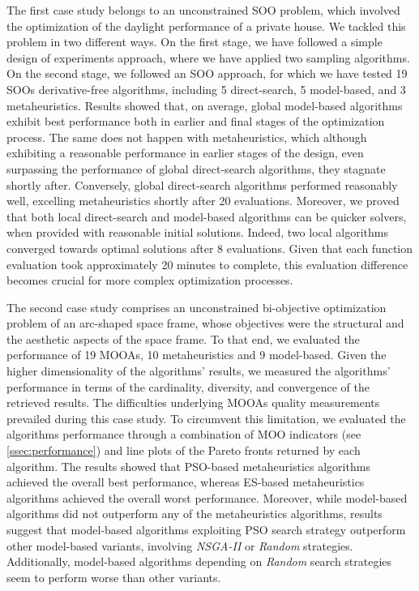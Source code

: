 The first case study belongs to an unconstrained \ac{SOO} problem, which involved the optimization of the daylight performance of a private house. We tackled this problem in two different ways. On the first stage, we have followed a simple design of experiments approach, where we have applied two sampling algorithms. On the second stage, we followed an \ac{SOO} approach, for which we have tested 19 \acp{SOO} derivative-free algorithms, including 5 direct-search, 5 model-based, and 3 metaheuristics. Results showed that, on average, global model-based algorithms exhibit best performance both in earlier and final stages of the optimization process. The same does not happen with metaheuristics, which although exhibiting a reasonable performance in earlier stages of the design, even surpassing the performance of global direct-search algorithms, they stagnate shortly after. Conversely, global direct-search algorithms performed reasonably well, excelling metaheuristics shortly after 20 evaluations. Moreover, we proved that both local direct-search and model-based algorithms can be quicker solvers, when provided with reasonable initial solutions. Indeed, two local algorithms converged towards optimal solutions after 8 evaluations. Given that each function evaluation took approximately 20 minutes to complete, this evaluation difference becomes crucial for more complex optimization processes.

The second case study comprises an unconstrained bi-objective optimization problem of an arc-shaped space frame, whose objectives were the structural and the aesthetic aspects of the space frame. To that end, we evaluated the performance of 19 \acp{MOOA}, 10 metaheuristics and 9 model-based. Given the higher dimensionality of the algorithms' results, we measured the algorithms' performance in terms of the cardinality, diversity, and convergence of the retrieved results.  The difficulties underlying \acp{MOOA} quality measurements prevailed during this case study. To circumvent this limitation, we evaluated the algorithms performance through a combination of \ac{MOO} indicators (see \cref{ssec:performance}) and line plots of the Pareto fronts returned by each algorithm. The results showed that \ac{PSO}-based metaheuristics  algorithms achieved the overall best performance, whereas \ac{ES}-based metaheuristics algorithms achieved the overall worst performance. Moreover, while model-based algorithms did not outperform any of the metaheuristics algorithms, results suggest that model-based algorithms exploiting \ac{PSO} search strategy outperform other model-based variants, involving \textit{\ac{NSGA-II}} or \textit{Random} strategies. Additionally, model-based algorithms depending on \textit{Random} search strategies seem to perform worse than other variants. 

